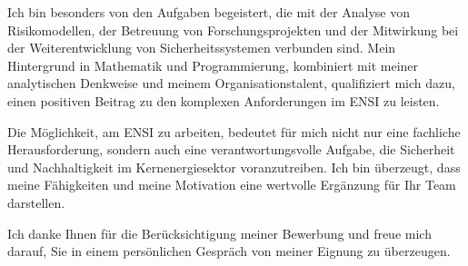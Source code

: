 \documentclass[11pt,a4paper,sans]{moderncv}
\begin{document}
Ich bin besonders von den Aufgaben begeistert, die mit der Analyse von Risikomodellen, der Betreuung von Forschungsprojekten und der Mitwirkung bei der Weiterentwicklung von Sicherheitssystemen verbunden sind. Mein Hintergrund in Mathematik und Programmierung, kombiniert mit meiner analytischen Denkweise und meinem Organisationstalent, qualifiziert mich dazu, einen positiven Beitrag zu den komplexen Anforderungen im ENSI zu leisten.

Die Möglichkeit, am ENSI zu arbeiten, bedeutet für mich nicht nur eine fachliche Herausforderung, sondern auch eine verantwortungsvolle Aufgabe, die Sicherheit und Nachhaltigkeit im Kernenergiesektor voranzutreiben. Ich bin überzeugt, dass meine Fähigkeiten und meine Motivation eine wertvolle Ergänzung für Ihr Team darstellen.

Ich danke Ihnen für die Berücksichtigung meiner Bewerbung und freue mich darauf, Sie in einem persönlichen Gespräch von meiner Eignung zu überzeugen.


\makeletterclosing
\end{document}
